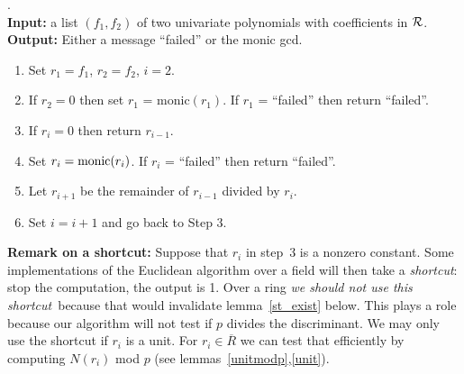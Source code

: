 \documentclass[10pt]{article}
\begin{document}
. \\
{\bf Input:} a list $(f_1,f_2)$ of two univariate polynomials with coefficients in ${\cal R}$. \\
{\bf Output:} Either a message ``failed'' or the monic gcd. \\[-15pt]
\begin{enumerate}
\item	Set $r_1 = f_1$, $r_2 = f_2$, $i = 2$.
\vspace*{-2mm}
\item	\label{monic1}
	If $r_2 = 0$ then set $r_1$ = monic$(r_1)$.
	If $r_1$ = ``failed'' then return ``failed''.\vspace*{-2mm}
\item	If $r_i = 0$ then return $r_{i-1}$.
\vspace*{-2mm}
\item	\label{monic2}
	Set $r_i = {\rm monic}(r_i)$.
	If $r_i$ = ``failed'' then return ``failed''. \vspace*{-2mm}
\item	Let $r_{i+1}$ be the remainder of $r_{i-1}$ divided by $r_i$.
\vspace*{-2mm}
\item	\label{laststep} Set $i = i+1$ and go back to Step 3.
\end{enumerate}
{\bf Remark on a shortcut:}
Suppose that $r_i$ in step~3 is a nonzero constant.
Some implementations of the Euclidean algorithm over a field will then take a
{\em shortcut}: stop the computation, the output is 1.
Over a ring {\em we should not use this shortcut}\ because that would invalidate
lemma~\ref{st_exist} below. This plays a role because our algorithm will
not test if $p$ divides the discriminant.
We may only use the shortcut if $r_i$ is a unit.
For $r_i \in \overline{R}$ we can test that efficiently
by computing $N(r_i)$ mod $p$ (see lemmas~\ref{unitmodp},\ref{unit}).
\\
\end{document}
